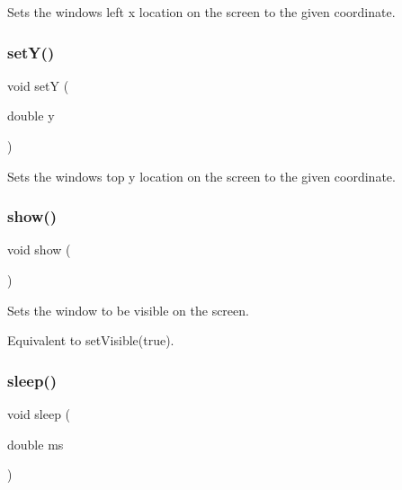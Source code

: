 Sets the window\textquotesingle{}s left x location on the screen to the given coordinate. 

\mbox{\label{classsgl_1_1GWindow_a7d57e2a5c35d27feb58fd498a3cf82b9}} 
\subsubsection{\texorpdfstring{set\+Y()}{setY()}}
{\footnotesize\ttfamily void setY (\begin{DoxyParamCaption}\item[{double}]{y }\end{DoxyParamCaption})\hspace{0.3cm}{\ttfamily [virtual]}}



Sets the window\textquotesingle{}s top y location on the screen to the given coordinate. 

\mbox{\label{classsgl_1_1GWindow_a4b148f40a95444d5669406b918ad2f52}} 
\subsubsection{\texorpdfstring{show()}{show()}}
{\footnotesize\ttfamily void show (\begin{DoxyParamCaption}{ }\end{DoxyParamCaption})\hspace{0.3cm}{\ttfamily [virtual]}}



Sets the window to be visible on the screen. 

Equivalent to set\+Visible(true). \mbox{\label{classsgl_1_1GWindow_aa3381590c1ef33c08000c2fbb2bf0dd0}} 
\subsubsection{\texorpdfstring{sleep()}{sleep()}}
{\footnotesize\ttfamily void sleep (\begin{DoxyParamCaption}\item[{double}]{ms }\end{DoxyParamCaption})\hspace{0.3cm}{\ttfamily [virtual]}}



